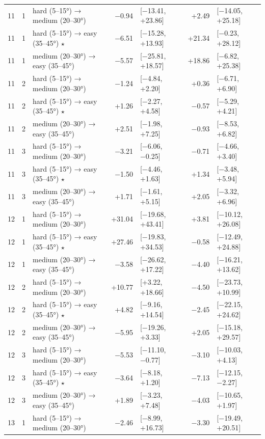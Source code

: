 \begin{table}[htbp]
\begin{tabular}{rllrlrl}
    11 & 1 & hard (5–15°) → medium (20–30°) & −0.94 & [−13.41, +23.86] & +2.49 & [−14.05, +25.18] \\
    11 & 1 & hard (5–15°) → easy (35–45°) $\star$ & −6.51 & [−15.28, +13.93] & +21.34 & [−0.23, +28.12] \\
    11 & 1 & medium (20–30°) → easy (35–45°) & −5.57 & [−25.81, +18.57] & +18.86 & [−6.82, +25.38] \\
    11 & 2 & hard (5–15°) → medium (20–30°) & −1.24 & [−4.84, +2.20] & +0.36 & [−6.71, +6.90] \\
    11 & 2 & hard (5–15°) → easy (35–45°) $\star$ & +1.26 & [−2.27, +4.58] & −0.57 & [−5.29, +4.21] \\
    11 & 2 & medium (20–30°) → easy (35–45°) & +2.51 & [−1.98, +7.25] & −0.93 & [−8.53, +6.82] \\
    11 & 3 & hard (5–15°) → medium (20–30°) & −3.21 & [−6.06, −0.25] & −0.71 & [−4.66, +3.40] \\
    11 & 3 & hard (5–15°) → easy (35–45°) $\star$ & −1.50 & [−4.46, +1.63] & +1.34 & [−3.48, +5.94] \\
    11 & 3 & medium (20–30°) → easy (35–45°) & +1.71 & [−1.61, +5.15] & +2.05 & [−3.32, +6.96] \\
    12 & 1 & hard (5–15°) → medium (20–30°) & +31.04 & [−19.68, +43.41] & +3.81 & [−10.12, +26.08] \\
    12 & 1 & hard (5–15°) → easy (35–45°) $\star$ & +27.46 & [−19.83, +34.53] & −0.58 & [−12.49, +24.88] \\
    12 & 1 & medium (20–30°) → easy (35–45°) & −3.58 & [−26.62, +17.22] & −4.40 & [−16.21, +13.62] \\
    12 & 2 & hard (5–15°) → medium (20–30°) & +10.77 & [+3.22, +18.66] & −4.50 & [−23.73, +10.99] \\
    12 & 2 & hard (5–15°) → easy (35–45°) $\star$ & +4.82 & [−9.16, +14.54] & −2.45 & [−22.15, +24.62] \\
    12 & 2 & medium (20–30°) → easy (35–45°) & −5.95 & [−19.26, +3.33] & +2.05 & [−15.18, +29.57] \\
    12 & 3 & hard (5–15°) → medium (20–30°) & −5.53 & [−11.10, −0.77] & −3.10 & [−10.03, +4.13] \\
    12 & 3 & hard (5–15°) → easy (35–45°) $\star$ & −3.64 & [−8.18, +1.20] & −7.13 & [−12.15, −2.27] \\
    12 & 3 & medium (20–30°) → easy (35–45°) & +1.89 & [−3.23, +7.48] & −4.03 & [−10.65, +1.97] \\
    13 & 1 & hard (5–15°) → medium (20–30°) & −2.46 & [−8.99, +16.73] & −3.30 & [−19.49, +20.51] \\

\end{tabular}
\end{table}
